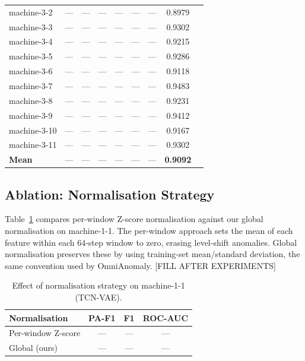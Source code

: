 \documentclass[10pt,twocolumn]{article}
\begin{document}
\begin{table}[t]
\begin{tabular}{lcccccccc}
machine-3-2  & --- & --- & --- & --- & --- & --- & 0.8979 \\
machine-3-3  & --- & --- & --- & --- & --- & --- & 0.9302 \\
machine-3-4  & --- & --- & --- & --- & --- & --- & 0.9215 \\
machine-3-5  & --- & --- & --- & --- & --- & --- & 0.9286 \\
machine-3-6  & --- & --- & --- & --- & --- & --- & 0.9118 \\
machine-3-7  & --- & --- & --- & --- & --- & --- & 0.9483 \\
machine-3-8  & --- & --- & --- & --- & --- & --- & 0.9231 \\
machine-3-9  & --- & --- & --- & --- & --- & --- & 0.9412 \\
machine-3-10 & --- & --- & --- & --- & --- & --- & 0.9167 \\
machine-3-11 & --- & --- & --- & --- & --- & --- & 0.9302 \\
\midrule
\textbf{Mean} & --- & --- & --- & --- & --- & --- & \textbf{0.9092} \\
\bottomrule
\end{tabular}
\end{table}

\subsection{Ablation: Normalisation Strategy}

Table~\ref{tab:normalisation} compares per-window Z-score normalisation against
our global normalisation on machine-1-1. The per-window approach sets the mean
of each feature within each 64-step window to zero, erasing level-shift
anomalies. Global normalisation preserves these by using training-set
mean/standard deviation, the same convention used by OmniAnomaly.
[FILL AFTER EXPERIMENTS]

\begin{table}[h]
\centering
\caption{Effect of normalisation strategy on machine-1-1 (TCN-VAE).}
\label{tab:normalisation}
\begin{tabular}{lccc}
\toprule
Normalisation & PA-F1 & F1 & ROC-AUC \\
\midrule
Per-window Z-score & --- & --- & --- \\
Global (ours)      & --- & --- & --- \\
\bottomrule
\end{tabular}
\end{table}
\end{document}
